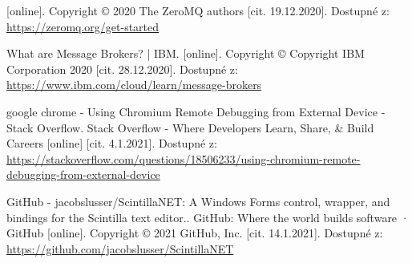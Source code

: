 \begin{thebibliography}{99}
[online]. Copyright © 2020 The ZeroMQ authors [cit. 19.12.2020]. Dostupné z: \url{https://zeromq.org/get-started}

What are Message Brokers? | IBM. [online]. Copyright © Copyright IBM Corporation 2020 [cit. 28.12.2020]. Dostupné z: \url{https://www.ibm.com/cloud/learn/message-brokers}

google chrome - Using Chromium Remote Debugging from External Device - Stack Overflow. Stack Overflow - Where Developers Learn, Share, \& Build Careers [online] [cit. 4.1.2021]. Dostupné z: \url{https://stackoverflow.com/questions/18506233/using-chromium-remote-debugging-from-external-device}

GitHub - jacobslusser/ScintillaNET: A Windows Forms control, wrapper, and bindings for the Scintilla text editor.. GitHub: Where the world builds software · GitHub [online]. Copyright © 2021 GitHub, Inc. [cit. 14.1.2021]. Dostupné z: \url{https://github.com/jacobslusser/ScintillaNET}

\end{thebibliography}
\newpage